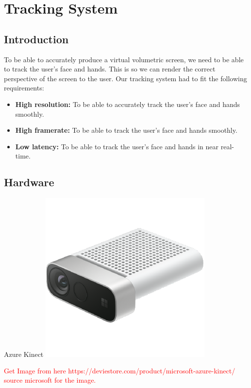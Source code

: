 \section{Tracking System}

\subsection{Introduction}

To be able to accurately produce a virtual volumetric screen, we need to be able to track the user's face and hands. This is so we can render the correct perspective of the screen to the user. Our tracking system had to fit the following requirements:
\begin{itemize}[itemsep=-0.25em]
	\item \textbf{High resolution:} To be able to accurately track the user's face and hands smoothly.
	\item \textbf{High framerate:} To be able to track the user's face and hands smoothly.
	\item \textbf{Low latency:} To be able to track the user's face and hands in near real-time.
\end{itemize}

\subsection{Hardware}

\begin{figureBox}[label={fig:kinect}, width=0.5\linewidth]{Azure Kinect}
    \includegraphics[width = 0.8\linewidth]{./implementation/figures/kinect.pdf}
\end{figureBox}
\textcolor{red}{Get Image from here https://deviestore.com/product/microsoft-azure-kinect/ source microsoft for the image.} \\

